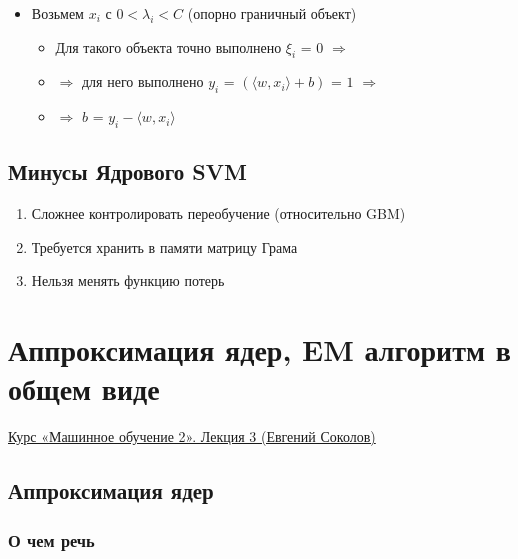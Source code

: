             \begin{itemize}
                \item Возьмем $x_i$ с $0 < \lambda_i < C$ (опорно граничный объект)
                \begin{itemize}
                    \item Для такого объекта точно выполнено $\xi_i$ = $0$ $\Longrightarrow$

                    \item \quad $\Longrightarrow$ для него выполнено $y_i$ = $(\langle w, x_i \rangle + b)$ = $1 $  $\Longrightarrow$ 

                    \item \quad\quad\quad$\Longrightarrow$ $b$ = $y_i - \langle w, x_i \rangle$
                \end{itemize}
                
            \end{itemize}

    \subsection{Минусы Ядрового SVM}
    \begin{enumerate}
        \item Сложнее контролировать переобучение (относительно GBM)

        \item Требуется хранить в памяти матрицу Грама

        \item Нельзя менять функцию потерь
    \end{enumerate}


\newpage
\section{Аппроксимация ядер, EM алгоритм в общем виде}

    \href{https://www.youtube.com/watch?v=jltDRejVmew&list=PLEqoHzpnmTfAVdVl2fH_je2_jWCEPAAqv&index=3}{Курс «Машинное обучение 2». Лекция 3 (Евгений Соколов)}

    \subsection{Аппроксимация ядер}

        \subsubsection{О чем речь}

